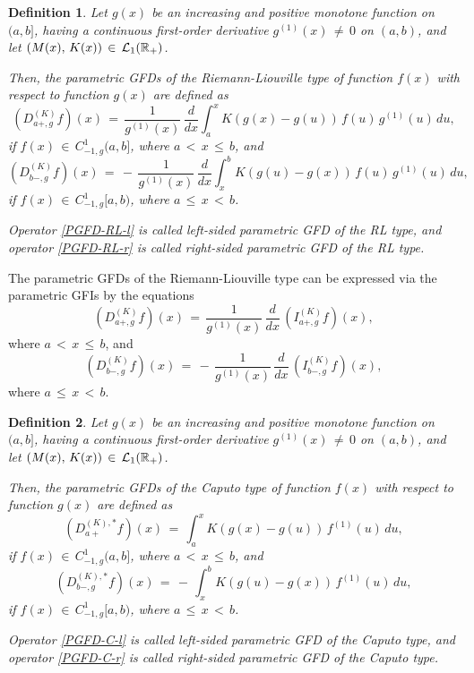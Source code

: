 \documentclass[12pt]{article}
\newtheorem{Definition}{Definition}
\begin{document}
\begin{Definition}
Let $g(x)$ be an increasing and positive monotone function on $(a, b]$, 
having a continuous first-order derivative $g^{(1)}(x) \, \ne \, 0$ on $(a, b)$, and let $( M(x) , \, K(x)) \, \in \, {\cal L}_{1}(\mathbb{R}_{+})$. 

Then, the parametric GFDs of the Riemann-Liouville type of function $f(x)$ with respect to function $g(x)$ are defined as
\begin{equation} \label{PGFD-RL-l}
(D^{(K)}_{a+,g} f)(x) \, = \, 
\frac{1}{g^{(1)}(x)} \, \frac{d}{dx}
\int^x_a K(g(x)-g(u)) \, f(u) \, g^{(1)}(u) \, du ,
\end{equation}
if $f(x) \, \in \, C^1_{-1,g}(a,b]$, 
where $a \, < \, x \, \le \, b$, and
\begin{equation} \label{PGFD-RL-r}
(D^{(K)}_{b-,g} f)(x) \, = \, 
- \, \frac{1}{g^{(1)}(x)} \, \frac{d}{dx}
\int^b_x K(g(u)-g(x)) \, f(u) \, g^{(1)}(u) \, du ,
\end{equation}
if $f(x) \, \in \, C^1_{-1,g}[a,b)$,
where $a \, \le \, x \, < \, b$.

Operator \eqref{PGFD-RL-l} is called left-sided parametric GFD of the RL type, and operator \eqref{PGFD-RL-r} is called right-sided parametric GFD of the RL type.

\end{Definition}

The parametric GFDs of the Riemann-Liouville type can be expressed via the parametric GFIs by the equations
\begin{equation} 
(D^{(K)}_{a+,g} f)(x) \, = \, 
\frac{1}{g^{(1)}(x)} \, \frac{d}{dx} \, 
(I^{(K)}_{a+,g} f)(x) ,
\end{equation}
where $a \, < \, x \, \le \, b$, and
\begin{equation}
(D^{(K)}_{b-,g} f)(x) \, = \, 
- \, \frac{1}{g^{(1)}(x)} \, \frac{d}{dx} \, 
(I^{(K)}_{b-,g} f)(x) ,
\end{equation}
where $a \, \le \, x \, < \, b$.


\begin{Definition}
Let $g(x)$ be an increasing and positive monotone function on $(a, b]$, 
having a continuous first-order derivative $g^{(1)}(x) \, \ne \, 0$ on $(a, b)$, and let $( M(x) , \, K(x)) \, \in \, {\cal L}_{1}(\mathbb{R}_{+})$. 

Then, the parametric GFDs of the Caputo type of function $f(x)$ with respect to function $g(x)$ are defined as
\begin{equation} \label{PGFD-C-l}
(D^{(K),*}_{a+} f)(x) \, = \, 
\int^x_a K(g(x)-g(u)) \, f^{(1)}(u) \, du ,
\end{equation}
if $f(x) \, \in \, C^1_{-1,g}(a,b]$,
where $a \, < \, x \, \le \, b$, and
\begin{equation} \label{PGFD-C-r}
(D^{(K),*}_{b-,g} f)(x) \, = \, 
- \, \int^b_x K(g(u)-g(x)) \, f^{(1)}(u) \, du ,
\end{equation}
if $f(x) \, \in \, C^1_{-1,g}[a,b)$,
where $a \, \le \, x \, < \, b$.

Operator \eqref{PGFD-C-l} is called left-sided parametric GFD of the Caputo type, and operator \eqref{PGFD-C-r} is called right-sided parametric GFD of the Caputo type.
\end{Definition}
\end{document}
